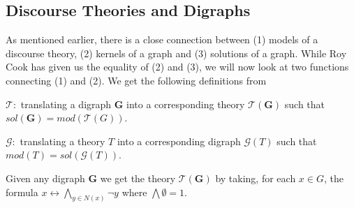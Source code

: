 \subsection{Discourse Theories and Digraphs}
\label{sub:Discourse Theories and Digraphs}
As mentioned earlier, there is a close connection between (1) models of a discourse theory, (2) kernels of a graph and (3) solutions of a graph.
While Roy Cook has given us the equality of (2) and (3), we will now look at two functions connecting (1) and (2).  We get the following definitions from \cite{}

$\mathcal{T}:$ translating a digraph \textbf{G} into a corresponding theory $\mathcal{T}(\mathbf{G})$ such that $sol(\mathbf{G}) = mod(\mathcal{T}(G))$.

$\mathcal{G}:$ translating a theory $T$ into a corresponding digraph $\mathcal{G}(T)$ such that $mod(T) = sol(\mathcal{G}(T))$.

Given any digraph \textbf{G} we get the theory $\mathcal{T}(\mathbf{G})$ by taking, for each $x \in G$, the formula $x \leftrightarrow \bigwedge_{y \in N(x)} \neg y$ where $\bigwedge \emptyset = 1$.\\

